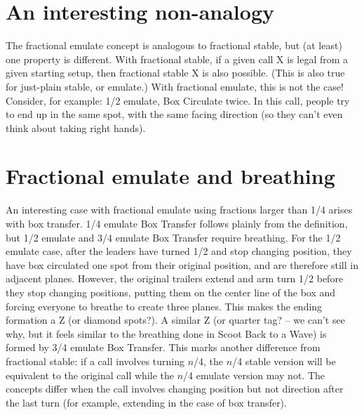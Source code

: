 \documentclass[11pt]{article}
\begin{document}
\section{An interesting non-analogy}

The fractional emulate concept is analogous to fractional stable,
but (at least) one property is different.
With fractional stable,
if a given call X is legal from a given starting setup,
then fractional stable X is also possible.
(This is also true for just-plain stable, or emulate.)
With fractional emulate, this is not the case!
Consider, for example: 1/2 emulate, Box Circulate twice.
In this call, people try to end up in the same spot,
with the same facing direction
(so they can't even think about taking right hands).


\section{Fractional emulate and breathing}

An interesting case with fractional emulate using fractions larger
than 1/4 arises with box transfer. 1/4 emulate Box Transfer
follows plainly from the definition,
but 1/2 emulate and 3/4 emulate
Box Transfer require breathing. For the 1/2 emulate case, after the leaders
have turned 1/2 and stop changing position, they have box circulated
one spot from their original position, and are therefore still in
adjacent planes. However, the original trailers extend and arm turn 1/2
before they stop changing positions, putting them on the center line
of the box and forcing everyone to breathe to create three planes.
This makes the ending formation a Z (or diamond spots?).
A similar Z (or quarter tag? -- we can't see why, but it feels similar
to the breathing done in Scoot Back to a Wave) is formed by
3/4 emulate Box Transfer. This marks another difference from
fractional stable: if a call involves turning $n$/4, the $n$/4 stable
version will be equivalent to the original call while the $n$/4
emulate version may not. The concepts differ when the call involves
changing position but not direction after the last turn (for example,
extending in the case of box transfer).

\end{document}
